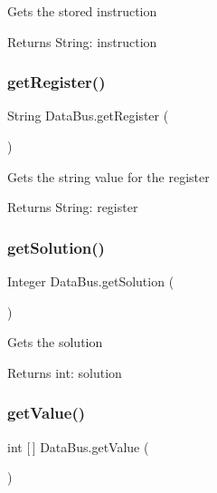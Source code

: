 Gets the stored instruction \begin{DoxyReturn}{Returns}
String\+: instruction 
\end{DoxyReturn}
\mbox{\label{class_data_bus_a999aeccf1731eb4f93af2ce38bce9f03}} 
\subsubsection{\texorpdfstring{get\+Register()}{getRegister()}}
{\footnotesize\ttfamily String Data\+Bus.\+get\+Register (\begin{DoxyParamCaption}{ }\end{DoxyParamCaption})\hspace{0.3cm}{\ttfamily [package]}}

Gets the string value for the register \begin{DoxyReturn}{Returns}
String\+: register 
\end{DoxyReturn}
\mbox{\label{class_data_bus_a5b660e1518f1460aad5a1219a668c400}} 
\subsubsection{\texorpdfstring{get\+Solution()}{getSolution()}}
{\footnotesize\ttfamily Integer Data\+Bus.\+get\+Solution (\begin{DoxyParamCaption}{ }\end{DoxyParamCaption})\hspace{0.3cm}{\ttfamily [package]}}

Gets the solution \begin{DoxyReturn}{Returns}
int\+: solution 
\end{DoxyReturn}
\mbox{\label{class_data_bus_a79d21b045c4657cf561f65c06e13b3e4}} 
\subsubsection{\texorpdfstring{get\+Value()}{getValue()}}
{\footnotesize\ttfamily int \mbox{[}$\,$\mbox{]} Data\+Bus.\+get\+Value (\begin{DoxyParamCaption}{ }\end{DoxyParamCaption})\hspace{0.3cm}{\ttfamily [package]}}

